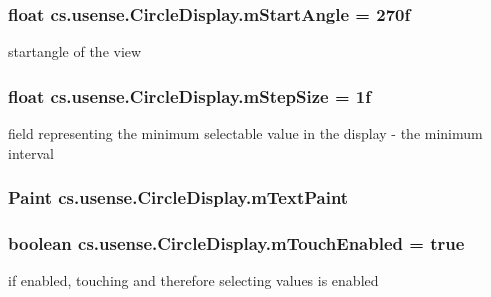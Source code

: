 \subsubsection[{m\+Start\+Angle}]{\setlength{\rightskip}{0pt plus 5cm}float cs.\+usense.\+Circle\+Display.\+m\+Start\+Angle = 270f\hspace{0.3cm}{\ttfamily [private]}}\label{classcs_1_1usense_1_1_circle_display_a5141939196ad8880e27ab7be82f72793}
startangle of the view \hypertarget{classcs_1_1usense_1_1_circle_display_ae35b4776dda580d3aa865f204efcffec}{}
\subsubsection[{m\+Step\+Size}]{\setlength{\rightskip}{0pt plus 5cm}float cs.\+usense.\+Circle\+Display.\+m\+Step\+Size = 1f\hspace{0.3cm}{\ttfamily [private]}}\label{classcs_1_1usense_1_1_circle_display_ae35b4776dda580d3aa865f204efcffec}
field representing the minimum selectable value in the display -\/ the minimum interval \hypertarget{classcs_1_1usense_1_1_circle_display_a222a7017e376f115236b12808129846e}{}
\subsubsection[{m\+Text\+Paint}]{\setlength{\rightskip}{0pt plus 5cm}Paint cs.\+usense.\+Circle\+Display.\+m\+Text\+Paint\hspace{0.3cm}{\ttfamily [private]}}\label{classcs_1_1usense_1_1_circle_display_a222a7017e376f115236b12808129846e}
\hypertarget{classcs_1_1usense_1_1_circle_display_a7a78f72cbacddc16ad4c821ac8ce845f}{}
\subsubsection[{m\+Touch\+Enabled}]{\setlength{\rightskip}{0pt plus 5cm}boolean cs.\+usense.\+Circle\+Display.\+m\+Touch\+Enabled = true\hspace{0.3cm}{\ttfamily [private]}}\label{classcs_1_1usense_1_1_circle_display_a7a78f72cbacddc16ad4c821ac8ce845f}
if enabled, touching and therefore selecting values is enabled \hypertarget{classcs_1_1usense_1_1_circle_display_aa4629b8ff331f623b98a6380ba49d4be}{}
